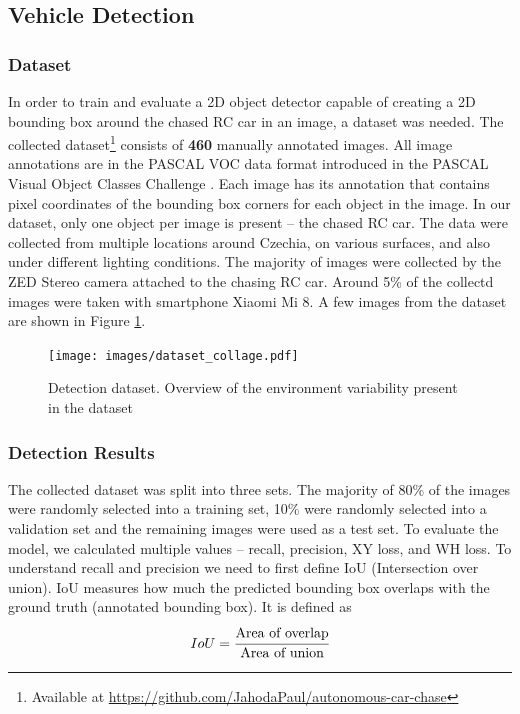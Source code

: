 \documentclass{ctuthesis/ctuthesis}
\begin{document}
\subsection{Vehicle Detection}
\subsubsection{Dataset} \label{s:detection_dataset}
In order to train and evaluate a 2D object detector capable of creating a 2D bounding box around the chased RC car in an image, a dataset was needed. The collected dataset\footnote{Available at \href{https://github.com/JahodaPaul/autonomous-car-chase}{https://github.com/JahodaPaul/autonomous-car-chase}} consists of \textbf{460} manually annotated images. All image annotations are in the PASCAL VOC data format introduced in the PASCAL Visual Object Classes Challenge \cite{pascal-voc}. Each image has its annotation that contains pixel coordinates of the bounding box corners for each object in the image. In our dataset, only one object per image is present -- the chased RC car. The data were collected from multiple locations around Czechia, on various surfaces, and also under different lighting conditions. The majority of images were collected by the ZED Stereo camera attached to the chasing RC car. Around 5\% of the collectd images were taken with smartphone Xiaomi Mi 8. A few images from the dataset are shown in Figure \ref{f:dataset_detection}.

\begin{figure}[]
    \centering
    \texttt{[image: images/dataset\_collage.pdf]}
    
    \caption{Detection dataset. Overview of the environment variability present in the dataset}\label{f:dataset_detection}
\end{figure}


\subsubsection{Detection Results}
The collected dataset was split into three sets. The majority of 80\% of the images were randomly selected into a training set, 10\% were randomly selected into a validation set and the remaining images were used as a test set. To evaluate the model, we calculated multiple values -- recall, precision, XY loss, and WH loss. To understand recall and precision we need to first define IoU (Intersection over union). IoU measures how much the predicted bounding box overlaps with the ground truth (annotated bounding box). It is defined as 
\begin{equation}IoU = \cfrac{\textrm{Area of overlap}}{\textrm{Area of union}}\end{equation}
\end{document}
